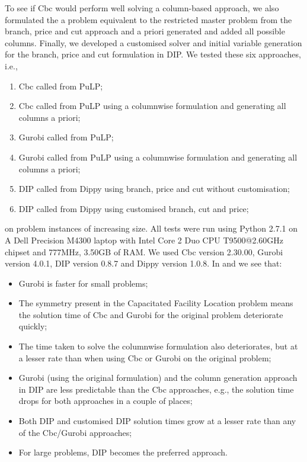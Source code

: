 To see if Cbc would perform well solving a column-based approach, we also formulated the a problem equivalent to the restricted master problem from the branch, price and cut approach and a priori generated and added all possible columns. Finally, we developed a customised solver and initial variable generation for the branch, price and cut formulation in \ac{DIP}. We tested these six approaches, i.e.,
\begin{enumerate}
\item Cbc called from PuLP;
\item Cbc called from PuLP using a columnwise formulation and generating all columns a priori;
\item Gurobi called from PuLP;
\item Gurobi called from PuLP using a columnwise formulation and generating all columns a priori;
\item \ac{DIP} called from Dippy using branch, price and cut without customisation;
\item \ac{DIP} called from Dippy using customised branch, cut and price;
\end{enumerate}
on problem instances of increasing size. All tests were run using Python 2.7.1 on A Dell Precision M4300 laptop with Intel Core 2 Duo CPU T9500@2.60GHz chipset and 777MHz, 3.50GB of RAM.  We used Cbc version 2.30.00, Gurobi version 4.0.1, \ac{DIP} version 0.8.7 and Dippy version 1.0.8. In  and  we see that:
\begin{itemize}
\item Gurobi is faster for small problems;
\item The symmetry present in the Capacitated Facility Location problem means the solution time of Cbc and Gurobi for the original problem deteriorate quickly;
\item The time taken to solve the columnwise formulation also deteriorates, but at a lesser rate than when using Cbc or Gurobi on the original problem;
\item Gurobi (using the original formulation) and the column generation approach in \ac{DIP} are less predictable than the Cbc approaches, e.g., the solution time drops for both approaches in a couple of places;
\item Both \ac{DIP} and customised \ac{DIP} solution times grow at a lesser rate than any of the Cbc/Gurobi approaches;
\item For large problems, \ac{DIP} becomes the preferred approach.
\end{itemize}
